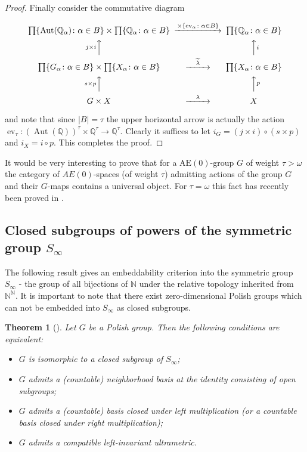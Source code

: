 \documentclass[12pt,draft]{amsart}
\theoremstyle{plain}
\newtheorem{thm}{Theorem}[section]
\theoremstyle{definition}
\numberwithin{equation}{section}
\begin{document}
\begin{proof}
Finally consider the commutative diagram

\[
\begin{CD}
\prod\{ \operatorname{Aut}({\mathbb Q}_{\alpha}) \colon
\alpha \in B\} \times \prod\{
{\mathbb Q}_{\alpha} \colon \alpha \in B\} @>\times\{
\operatorname{ev}_{\alpha} \colon \alpha \in B\}>> \prod\{
{\mathbb Q}_{\alpha} \colon \alpha \in B\}\\
@A{j \times i}AA @AA{i}A\\
\prod\{ G_{\alpha} \colon \alpha \in B\} \times
\prod\{ X_{\alpha} \colon \alpha \in B\} @>\widetilde{\lambda}>>
\prod\{ X_{\alpha} \colon \alpha \in B\}\\
@A{s\times p}AA @AA{p}A\\
G\times X @>\lambda>> X
\end{CD}
\]

\noindent and note that since $|B| = \tau$ the upper horizontal
arrow is actually the action
$\operatorname{ev}_{\tau} \colon \left(\operatorname{Aut}(
{\mathbb Q})\right)^{\tau}\times {\mathbb Q}^{\tau}
\to {\mathbb Q}^{\tau}$. Clearly it suffices to let
$i_{G} = (j \times i) \circ (s \times p)$ and $i_{X} = i \circ p$.
This completes the proof.
\end{proof}

It would be very interesting to prove that for a $\text{AE}(0)$-group
$G$ of weight $\tau > \omega$ the
category of  $AE(0)$-spaces (of weight $\tau$) admitting actions of the
group $G$ and their $G$-maps contains a universal object. For
$\tau = \omega$ this fact has recently been proved in \cite{hjo99}.

\subsection{Closed subgroups of powers of the
symmetric group $S_{\infty}$}\label{SS:symmetric}


The following result gives an embeddability criterion into
the symmetric group $S_{\infty}$ - the group
of all bijections of ${\mathbb N}$ under the relative topology
inherited from ${\mathbb N}^{\mathbb N}$. It is important to note
\cite{dough94} that there exist zero-dimensional Polish groups
which can not be embedded into $S_{\infty}$ as closed subgroups.

\begin{thm}[\cite{bekech96}]\label{T:beke}
Let $G$ be a Polish group. Then the following conditions are equivalent:
\begin{itemize}
\item[(i)]
$G$ is isomorphic to a closed subgroup of $S_{\infty}$;
\item[(ii)]
$G$ admits a (countable) neighborhood basis at the identity
consisting of open subgroups;
\item[(iii)]
$G$ admits a (countable) basis closed under left multiplication
(or a countable basis closed under right multiplication);
\item[(iv)]
$G$ admits a compatible left-invariant ultrametric.
\end{itemize}
\end{thm}
\end{document}
